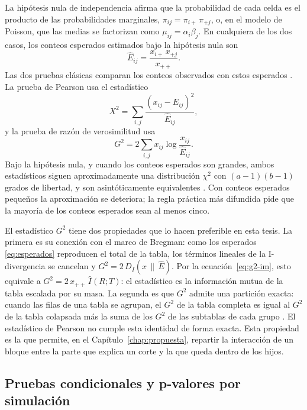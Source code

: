La hipótesis nula de independencia afirma que la probabilidad de cada celda es el
producto de las probabilidades marginales, $\pi_{ij} = \pi_{i+}\,\pi_{+j}$, o, en
el modelo de Poisson, que las medias se factorizan como $\mu_{ij} = \alpha_i
\beta_j$. En cualquiera de los dos casos, los conteos esperados estimados bajo la
hipótesis nula son
\begin{equation}\label{eq:esperados}
  \hat{E}_{ij} = \frac{x_{i+}\, x_{+j}}{x_{++}} .
\end{equation}
Las dos pruebas clásicas comparan los conteos observados con estos esperados
\cite{Agresti2013}. La prueba de Pearson usa el estadístico
\begin{equation}\label{eq:pearson}
  X^2 = \sum_{i,j} \frac{(x_{ij} - \hat{E}_{ij})^2}{\hat{E}_{ij}} ,
\end{equation}
y la prueba de razón de verosimilitud usa
\begin{equation}\label{eq:g2}
  G^2 = 2 \sum_{i,j} x_{ij} \log \frac{x_{ij}}{\hat{E}_{ij}} .
\end{equation}
Bajo la hipótesis nula, y cuando los conteos esperados son grandes, ambos
estadísticos siguen aproximadamente una distribución $\chi^2$ con
$(a-1)(b-1)$ grados de libertad, y son asintóticamente equivalentes
\cite{Agresti2013}. Con conteos esperados pequeños la aproximación se deteriora;
la regla práctica más difundida pide que la mayoría de los conteos esperados sean
al menos cinco.

El estadístico $G^2$ tiene dos propiedades que lo hacen preferible en esta tesis.
La primera es su conexión con el marco de Bregman: como los esperados
\eqref{eq:esperados} reproducen el total de la tabla, los términos lineales de la
I-divergencia se cancelan y $G^2 = 2\,D_I(x \,\|\, \hat{E})$. Por la
ecuación~\eqref{eq:g2-im}, esto equivale a $G^2 = 2\,x_{++}\,\hat{I}(R;T)$: el
estadístico es la información mutua de la tabla escalada por su masa. La segunda
es que $G^2$ admite una partición exacta: cuando las filas de una tabla se
agrupan, el $G^2$ de la tabla completa es igual al $G^2$ de la tabla colapsada más
la suma de los $G^2$ de las subtablas de cada grupo \cite{Agresti2013}. El
estadístico de Pearson no cumple esta identidad de forma exacta. Esta propiedad
es la que permite, en el Capítulo~\ref{chap:propuesta}, repartir la interacción
de un bloque entre la parte que explica un corte y la que queda dentro de los
hijos.

\subsection{Pruebas condicionales y p-valores por simulación}\label{sec:est-permutacion}

